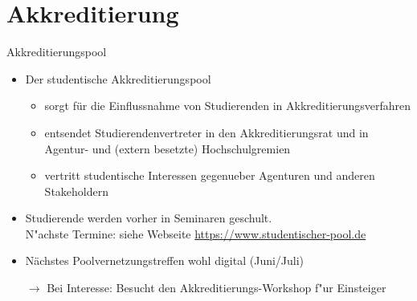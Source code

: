 \documentclass[compress, aspectratio=169]{beamer}
\begin{document}



\section{Akkreditierung}

\begin{frame}{Akkreditierungspool}
    \begin{itemize}
        \item Der studentische Akkreditierungspool
        \begin{itemize}
        	\item sorgt für die Einflussnahme von Studierenden in Akkreditierungsverfahren
        	\item entsendet Studierendenvertreter in den Akkreditierungsrat und in Agentur- und (extern besetzte) Hochschulgremien
        	\item vertritt studentische Interessen gegenueber Agenturen und anderen Stakeholdern
        \end{itemize}         
        \item Studierende werden vorher in Seminaren geschult. \\
          {\scriptsize\color{blue} N"achste Termine: siehe Webseite \url{https://www.studentischer-pool.de}}
        \item Nächstes Poolvernetzungstreffen wohl digital {\color{blue} (Juni/Juli)}
        \vspace{0.5cm}
        \item[$\rightarrow$] Bei Interesse: Besucht den Akkreditierungs-Workshop f"ur Einsteiger
    \end{itemize}
\end{frame}

\end{document}
